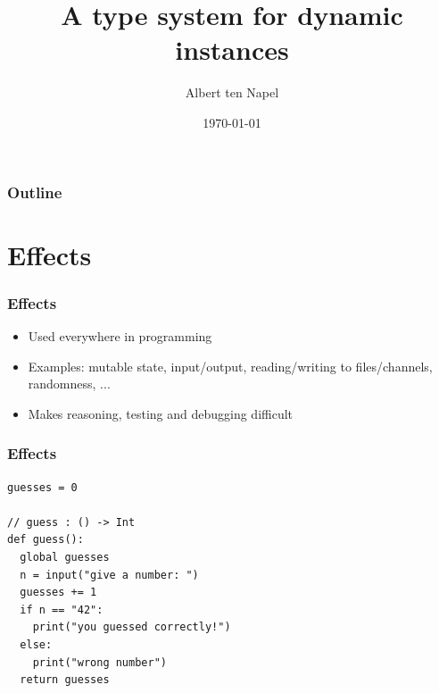\documentclass{beamer}
\title[A type system for dynamic instances]{A type system for dynamic instances}
\institute[TU Delft]{Delft University of Technology}
\author{Albert ten Napel}
\date{\today}
\newcommand*\titleTOC{Outline}
\begin{document}
{
%
\frame{\titlepage}
}

{
\begin{frame}\frametitle{\titleTOC}
	\tableofcontents
\end{frame}
}

\section{Effects}

\begin{frame}[fragile]\frametitle{Effects}
\begin{itemize}
\item Used everywhere in programming
\item Examples: mutable state, input/output, reading/writing to files/channels, randomness, ...
\item Makes reasoning, testing and debugging difficult
\end{itemize}
\end{frame}

\begin{frame}[fragile]\frametitle{Effects}
	\begin{example}
		\begin{verbatim}
guesses = 0

// guess : () -> Int
def guess():
  global guesses
  n = input("give a number: ")
  guesses += 1
  if n == "42":
    print("you guessed correctly!")
  else:
    print("wrong number")
  return guesses
		\end{verbatim}
	\end{example}
\end{frame}
\end{document}
